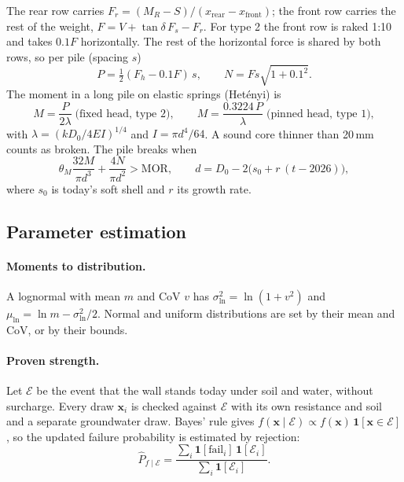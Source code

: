 The rear row carries $F_r = (M_R - S)/(x_\text{rear} - x_\text{front})$; the
front row carries the rest of the weight, $F = V + \tan\delta\,F_s - F_r$. For
type 2 the front row is raked 1:10 and takes $0.1F$ horizontally. The rest of
the horizontal force is shared by both rows, so per pile (spacing $s$)
\begin{equation}
P = \tfrac12 (F_h - 0.1F)\,s, \qquad N = F s \sqrt{1 + 0.1^2}.
\end{equation}
The moment in a long pile on elastic springs (Hetényi) is
\begin{equation}
M = \frac{P}{2\lambda} \;\text{(fixed head, type 2)}, \qquad
M = \frac{0.3224\,P}{\lambda} \;\text{(pinned head, type 1)},
\end{equation}
with $\lambda = \left(k D_0 / 4 E I\right)^{1/4}$ and $I = \pi d^4/64$.
A sound core thinner than 20\,mm counts as broken.
The pile breaks when
\begin{equation}
\theta_M \frac{32 M}{\pi d^3} + \frac{4N}{\pi d^2} > \text{MOR},
\qquad d = D_0 - 2\bigl(s_0 + r\,(t - 2026)\bigr),
\end{equation}
where $s_0$ is today's soft shell and $r$ its growth rate.

\subsection{Parameter estimation}\label{app:prob-estimation}

\paragraph{Moments to distribution.} A lognormal with mean $m$ and CoV $v$ has
$\sigma_{\ln}^2 = \ln(1 + v^2)$ and $\mu_{\ln} = \ln m - \sigma_{\ln}^2/2$.
Normal and uniform distributions are set by their mean and CoV, or by their
bounds.

\paragraph{Proven strength.} Let $\mathcal{E}$ be the event that the wall stands today
under soil and water, without surcharge. Every draw $\mathbf{x}_i$ is checked
against $\mathcal{E}$ with its own resistance and soil and a separate groundwater draw.
Bayes' rule gives $f(\mathbf{x} \mid \mathcal{E}) \propto f(\mathbf{x})\,
\mathbf{1}[\mathbf{x} \in \mathcal{E}]$, so the updated failure probability is
estimated by rejection:
\begin{equation}
\hat P_{f\mid \mathcal{E}} = \frac{\sum_i \mathbf{1}[\text{fail}_i]\,\mathbf{1}[\mathcal{E}_i]}{\sum_i \mathbf{1}[\mathcal{E}_i]}.
\end{equation}

